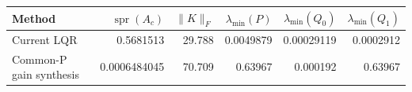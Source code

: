 \begin{tabular}{lrrrrr}
\toprule
Method & $\operatorname{spr}(A_c)$ & $\|K\|_F$ & $\lambda_{\min}(P)$ & $\lambda_{\min}(Q_0)$ & $\lambda_{\min}(Q_1)$ \\
\midrule
Current LQR & 0.5681513 & 29.788 & 0.0049879 & 0.00029119 & 0.0002912 \\
Common-P gain synthesis & 0.0006484045 & 70.709 & 0.63967 & 0.000192 & 0.63967 \\
\bottomrule
\end{tabular}
